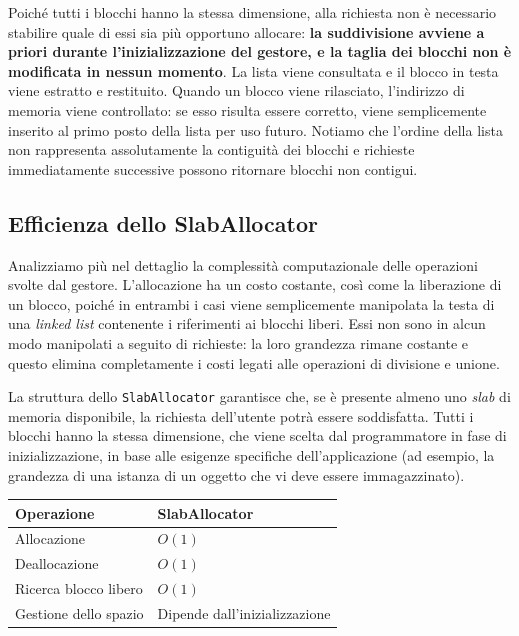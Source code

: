 Poiché tutti i blocchi hanno la stessa dimensione, alla richiesta non è necessario stabilire quale di essi sia più opportuno allocare: \textbf{la suddivisione avviene a priori durante l’inizializzazione del gestore, e la taglia dei blocchi non è modificata in nessun momento}. La lista viene consultata e il blocco in testa viene estratto e restituito. Quando un blocco viene rilasciato, l’indirizzo di memoria viene controllato: se esso risulta essere corretto, viene semplicemente inserito al primo posto della lista per uso futuro. Notiamo che l’ordine della lista non rappresenta assolutamente la contiguità dei blocchi e richieste immediatamente successive possono ritornare blocchi non contigui.

\subsection*{Efficienza dello SlabAllocator}
Analizziamo più nel dettaglio la complessità computazionale delle operazioni svolte dal gestore. L’allocazione ha un costo costante, così come la liberazione di un blocco, poiché in entrambi i casi viene semplicemente manipolata la testa di una \textit{linked list} contenente i riferimenti ai blocchi liberi. Essi non sono in alcun modo manipolati a seguito di richieste: la loro grandezza rimane costante e questo elimina completamente i costi legati alle operazioni di divisione e unione.

La struttura dello \texttt{SlabAllocator} garantisce che, se è presente almeno uno \textit{slab} di memoria disponibile, la richiesta dell’utente potrà essere soddisfatta. Tutti i blocchi hanno la stessa dimensione, che viene scelta dal programmatore in fase di inizializzazione, in base alle esigenze specifiche dell’applicazione (ad esempio, la grandezza di una istanza di un oggetto che vi deve essere immagazzinato).

\begin{center}
\begin{tabular}{|l|p{8cm}|}
\hline
Operazione & SlabAllocator \\
\hline
Allocazione & $O(1)$ \\
Deallocazione & $O(1)$ \\
Ricerca blocco libero & $O(1)$ \\
Gestione dello spazio & Dipende dall'inizializzazione \\
\hline
\end{tabular}
\end{center}

